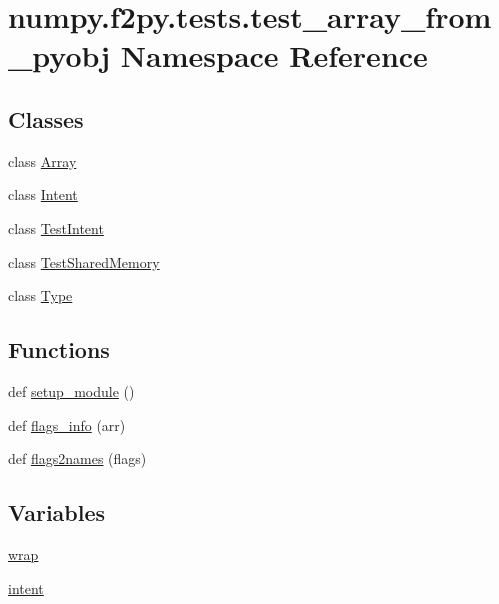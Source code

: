 \hypertarget{namespacenumpy_1_1f2py_1_1tests_1_1test__array__from__pyobj}{}\section{numpy.\+f2py.\+tests.\+test\+\_\+array\+\_\+from\+\_\+pyobj Namespace Reference}
\label{namespacenumpy_1_1f2py_1_1tests_1_1test__array__from__pyobj}
\subsection*{Classes}
\begin{DoxyCompactItemize}
\item 
class \hyperlink{classnumpy_1_1f2py_1_1tests_1_1test__array__from__pyobj_1_1Array}{Array}
\item 
class \hyperlink{classnumpy_1_1f2py_1_1tests_1_1test__array__from__pyobj_1_1Intent}{Intent}
\item 
class \hyperlink{classnumpy_1_1f2py_1_1tests_1_1test__array__from__pyobj_1_1TestIntent}{Test\+Intent}
\item 
class \hyperlink{classnumpy_1_1f2py_1_1tests_1_1test__array__from__pyobj_1_1TestSharedMemory}{Test\+Shared\+Memory}
\item 
class \hyperlink{classnumpy_1_1f2py_1_1tests_1_1test__array__from__pyobj_1_1Type}{Type}
\end{DoxyCompactItemize}
\subsection*{Functions}
\begin{DoxyCompactItemize}
\item 
def \hyperlink{namespacenumpy_1_1f2py_1_1tests_1_1test__array__from__pyobj_af748902b94a48584b7cc1f83fff5b4b9}{setup\+\_\+module} ()
\item 
def \hyperlink{namespacenumpy_1_1f2py_1_1tests_1_1test__array__from__pyobj_a8964864b142e235e00caae0648743a3f}{flags\+\_\+info} (arr)
\item 
def \hyperlink{namespacenumpy_1_1f2py_1_1tests_1_1test__array__from__pyobj_a91b8f2c50ec1c57872241223efcbc804}{flags2names} (flags)
\end{DoxyCompactItemize}
\subsection*{Variables}
\begin{DoxyCompactItemize}
\item 
\hyperlink{namespacenumpy_1_1f2py_1_1tests_1_1test__array__from__pyobj_a19b115ccad3a25daed141c84e50db027}{wrap}
\item 
\hyperlink{namespacenumpy_1_1f2py_1_1tests_1_1test__array__from__pyobj_a3022bfdbd0760559a63ec02aab72f51c}{intent}
\end{DoxyCompactItemize}


